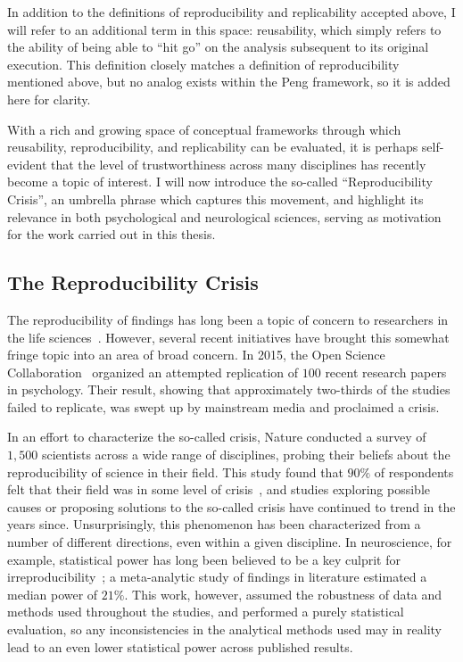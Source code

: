 In addition to the definitions of reproducibility and replicability accepted above, I will refer to an additional term
in this space: reusability, which simply refers to the ability of being able to ``hit go'' on the analysis
subsequent to its original execution. This definition closely matches a definition of reproducibility mentioned above,
but no analog exists within the Peng framework, so it is added here for clarity.

With a rich and growing space of conceptual frameworks through which reusability, reproducibility, and
replicability can be evaluated, it is perhaps self-evident that the level of trustworthiness across many disciplines
has recently become a topic of interest. I will now introduce the so-called ``Reproducibility Crisis'', an umbrella
phrase which captures this movement, and highlight its relevance in both psychological and neurological sciences,
serving as motivation for the work carried out in this thesis.

\subsection{The Reproducibility Crisis}

The reproducibility of findings has long been a topic of concern to researchers in the life
sciences~\cite{ioannidis2005most,begley2012raise,prinz2011believe,mcnutt2014reproducibility}. However, several recent
initiatives have brought this somewhat fringe topic into an area of broad concern. In 2015, the Open Science
Collaboration~\cite{open2015estimating} organized an attempted replication of $100$ recent research papers in
psychology. Their result, showing that approximately two-thirds of the studies failed to replicate, was swept up by
mainstream media and proclaimed a crisis.

In an effort to characterize the so-called crisis, Nature conducted a survey of $1,500$ scientists across a wide
range of disciplines, probing their beliefs about the reproducibility of science in their field. This study found that
$90\%$ of respondents felt that their field was in some level of crisis~\cite{baker20161}, and studies exploring
possible causes or proposing solutions to the so-called crisis have continued to trend in the years since.
Unsurprisingly, this phenomenon has been characterized from a number of different directions, even within a given
discipline. In neuroscience, for example, statistical power has long been believed to be a key culprit for
irreproducibility~\cite{button2013power}; a meta-analytic study of findings in literature estimated a median power of
$21\%$. This work, however, assumed the robustness of data and methods used throughout the studies, and performed a
purely statistical evaluation, so any inconsistencies in the analytical methods used may in reality lead to an even
lower statistical power across published results.

